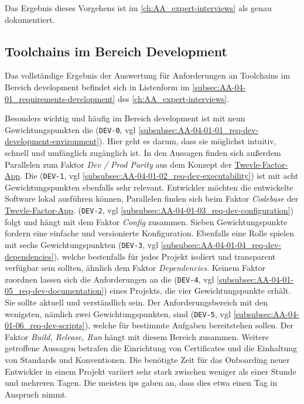 Das Ergebnis dieses Vorgehens ist im \autoref{ch:AA_expert-interviews} als  genau dokumentiert.

\subsection{Toolchains im Bereich Development}
\label{subsec:04-02-02_toolchains-in-development}

Das vollständige Ergebnis der Auswertung für Anforderungen an Toolchains im Bereich \Gls{development} befindet sich in Listenform im \autoref{subsec:AA-04-01_requirements-development} des \autoref{ch:AA_expert-interviews}.

Besonders wichtig und häufig im Bereich \Gls{development} ist mit neun Gewichtungspunkten die \textbf{} (\texttt{DEV-0}, \acrshort{vgl} \autoref{subsubsec:AA-04-01-01_req-dev-development-environment}). Hier geht es darum, dass sie möglichst intuitiv, schnell und umfänglich zugänglich ist. In den Aussagen finden sich außerdem Parallelen zum Faktor \textit{Dev / Prod Parity} aus dem Konzept der \hyperref[sec:03-05_concept-of-twelve-factor-app]{Twevle-Factor-App}. Die \textbf{} (\texttt{DEV-1}, \acrshort{vgl} \autoref{subsubsec:AA-04-01-02_req-dev-executability}) ist mit acht Gewichtungspunkten ebenfalls sehr relevant. Entwickler möchten die entwickelte Software lokal ausführen können, Parallelen finden sich beim Faktor \textit{Codebase} der \hyperref[sec:03-05_concept-of-twelve-factor-app]{Twevle-Factor-App}. \textbf{} (\texttt{DEV-2}, \acrshort{vgl} \autoref{subsubsec:AA-04-01-03_req-dev-configuration}) folgt und hängt mit dem Faktor \textit{Config} zusammen. Sieben Gewichtungspunkte fordern eine einfache und versionierte Konfiguration. Ebenfalls eine Rolle spielen mit sechs Gewichtungspunkten \textbf{} (\texttt{DEV-3}, \acrshort{vgl} \autoref{subsubsec:AA-04-01-04_req-dev-dependencies}), welche bestenfalls für jedes Projekt isoliert und transparent verfügbar sein sollten, ähnlich dem Faktor \textit{Dependencies}. Keinem Faktor zuordnen lassen sich die Anforderungen an die \textbf{} (\texttt{DEV-4}, \acrshort{vgl} \autoref{subsubsec:AA-04-01-05_req-dev-documentation}) eines Projekts, die vier Gewichtungspunkte erhält. Sie sollte aktuell und verständlich sein. Der Anforderungsbereich mit den wenigsten, nämlich zwei Gewichtungspunkten, sind \textbf{} (\texttt{DEV-5}, \acrshort{vgl} \autoref{subsubsec:AA-04-01-06_req-dev-scripts}), welche für bestimmte Aufgaben bereitstehen sollen. Der Faktor \textit{Build, Release, Run} hängt mit diesem Bereich zusammen. Weitere getroffene Aussagen betrafen die Einrichtung von Certificates und die Einhaltung von Standards und Konventionen. Die benötigte Zeit für das Onboarding neuer Entwickler in einem Projekt variiert sehr stark zwischen weniger als einer Stunde und mehreren Tagen. Die meisten \Glspl{ip} gaben an, dass dies etwa einen Tag in Anspruch nimmt.

